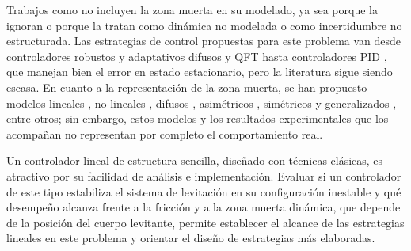 \begin{sloppypar}
Trabajos como \cite{khimani,mukesh,neelma} no incluyen la zona muerta en su modelado, ya sea porque la ignoran o porque la tratan como dinámica no modelada o como incertidumbre no estructurada. Las estrategias de control propuestas para este problema van desde controladores robustos y adaptativos difusos y QFT hasta controladores PID \cite{kuo1,mukesh,maaz}, que manejan bien el error en estado estacionario, pero la literatura sigue siendo escasa. En cuanto a la representación de la zona muerta, se han propuesto modelos lineales \cite{salim}, no lineales \cite{huanqing}, difusos \cite{zhi}, asimétricos \cite{gang}, simétricos \cite{nizar} y generalizados \cite{guanyu}, entre otros; sin embargo, estos modelos y los resultados experimentales que los acompañan no representan por completo el comportamiento real.

Un controlador lineal de estructura sencilla, diseñado con técnicas clásicas, es atractivo por su facilidad de análisis e implementación. Evaluar si un controlador de este tipo estabiliza el sistema de levitación en su configuración inestable y qué desempeño alcanza frente a la fricción y a la zona muerta dinámica, que depende de la posición del cuerpo levitante, permite establecer el alcance de las estrategias lineales en este problema y orientar el diseño de estrategias más elaboradas.

\end{sloppypar}
